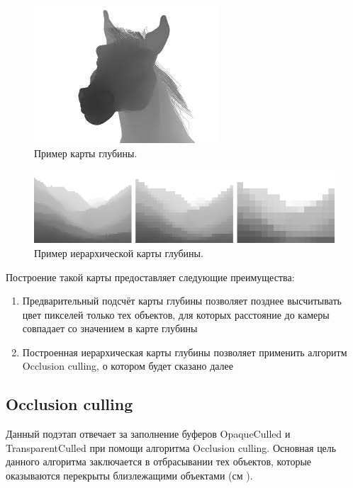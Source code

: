 		\begin{figure}[ht!] 
			\center
			\includegraphics [scale=1] {my_folder/images//depth_map}	
			\caption{Пример карты глубины.} 
			\label{fig:depth_map}
		\end{figure}
		
		\begin{figure}[ht!] 
			\center
			\includegraphics [scale=1] {my_folder/images//hier_depth_map}	
			\caption{Пример иерархической карты глубины.} 
			\label{fig:hier_depth_map}
		\end{figure}
		\FloatBarrier
		Построение такой карты предоставляет следующие преимущества:
		\begin{enumerate}[1.]
			\item Предварительный подсчёт карты глубины позволяет позднее высчитывать цвет пикселей только тех объектов, для которых расстояние до камеры совпадает со значением в карте глубины
			\item Построенная иерархическая карты глубины позволяет применить алгоритм Occlusion culling, о котором будет сказано далее
		\end{enumerate}
	\subsection{Occlusion culling} \label{ch3:pre_pass:occlusion}
		Данный подэтап отвечает за заполнение буферов OpaqueCulled и  TransparentCulled при помощи алгоритма Occlusion culling\cite{greene1993hierarchical}. Основная цель данного алгоритма заключается в отбрасывании тех объектов, которые оказываются перекрыты близлежащими объектами (см ). 
		
